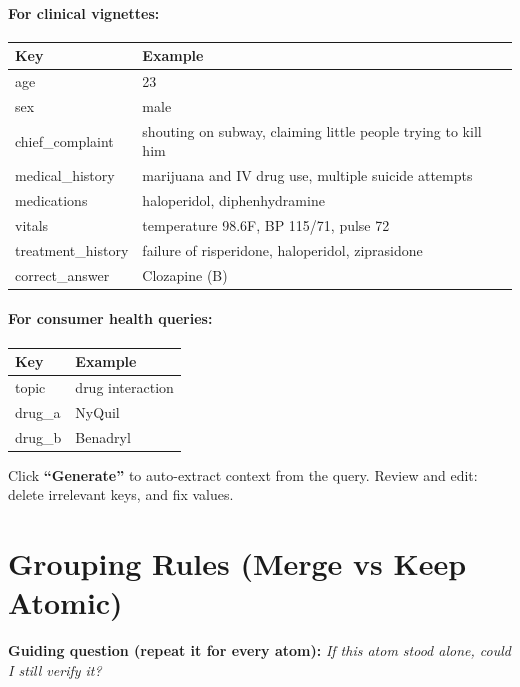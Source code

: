 \documentclass{article}
\begin{document}
\paragraph{For clinical vignettes:}
\begin{center}
\begin{tabular}{@{}ll@{}}
\toprule
\textbf{Key} & \textbf{Example} \\
\midrule
age & 23 \\
sex & male \\
chief\_complaint & shouting on subway, claiming little people trying to kill him \\
medical\_history & marijuana and IV drug use, multiple suicide attempts \\
medications & haloperidol, diphenhydramine \\
vitals & temperature 98.6\textdegree{}F, BP 115/71, pulse 72 \\
treatment\_history & failure of risperidone, haloperidol, ziprasidone \\
correct\_answer & Clozapine (B) \\
\bottomrule
\end{tabular}
\end{center}

\paragraph{For consumer health queries:}
\begin{center}
\begin{tabular}{@{}ll@{}}
\toprule
\textbf{Key} & \textbf{Example} \\
\midrule
topic & drug interaction \\
drug\_a & NyQuil \\
drug\_b & Benadryl \\
\bottomrule
\end{tabular}
\end{center}

Click \textbf{``Generate''} to auto-extract context from the query. Review and edit: delete irrelevant keys, and fix values.


\section{Grouping Rules (Merge vs Keep Atomic)}
\label{sec:grouping}

\textbf{Guiding question (repeat it for every atom):} \textit{If this atom stood alone, could I still verify it?}
\end{document}
